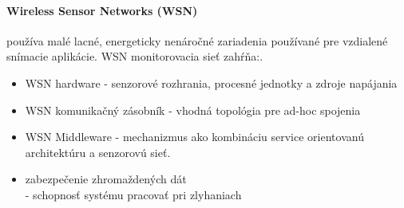 \documentclass[../../main.tex]{subfiles}
\begin{document}
\paragraph{Wireless Sensor Networks (WSN)} používa malé lacné, energeticky nenáročné  zariadenia používané pre vzdialené snímacie aplikácie. \cite{springerprofessional.de_The_Era_of_IoT}
WSN monitorovacia sieť zahŕňa:. \cite{GUBBI20131645} 
\begin{multicols}{2}
    \begin{itemize}
        \item WSN hardware - senzorové rozhrania, procesné jednotky a zdroje napájania \item  WSN komunikačný zásobník - vhodná topológia pre ad-hoc spojenia\item WSN Middleware - mechanizmus ako kombináciu service orientovanú architektúru a senzorovú sieť.
        \item zabezpečenie zhromaždených dát \\ - schopnosť systému pracovať pri zlyhaniach
        
    \end{itemize}
\end{multicols}
\end{document}
